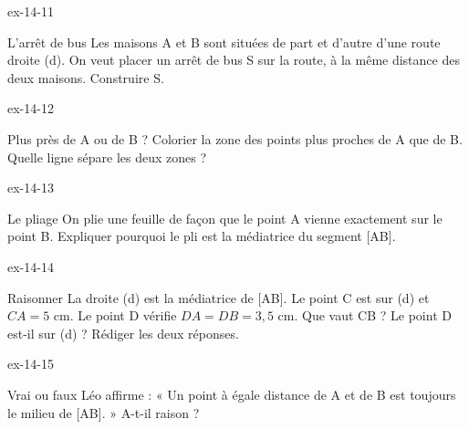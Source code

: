 \begin{blocLivre}{ex-14-11}\begin{exercice}[3]{L’arrêt de bus}
Les maisons A et B sont situées de part et d’autre d’une route droite (d). On veut placer un arrêt de bus S sur la route, à la même distance des deux maisons. Construire S.
\label{fig-ex-14-11}
\end{exercice}\end{blocLivre}
\begin{blocLivre}{ex-14-12}\begin{exercice}[3]{Plus près de A ou de B ?}
Colorier la zone des points plus proches de A que de B. Quelle ligne sépare les deux zones ?
\label{fig-ex-14-12}
\end{exercice}\end{blocLivre}
\begin{blocLivre}{ex-14-13}\begin{exercice}[3]{Le pliage}
On plie une feuille de façon que le point A vienne exactement sur le point B. Expliquer pourquoi le pli est la médiatrice du segment [AB].
\label{fig-ex-14-13}
\end{exercice}\end{blocLivre}
\begin{blocLivre}{ex-14-14}\begin{exercice}[3]{Raisonner}
La droite (d) est la médiatrice de [AB]. Le point C est sur (d) et $CA=5$ cm. Le point D vérifie $DA=DB=3{,}5$ cm. Que vaut CB ? Le point D est-il sur (d) ? Rédiger les deux réponses.
\label{fig-ex-14-14}
\end{exercice}\end{blocLivre}
\begin{blocLivre}{ex-14-15}\begin{exercice}[3]{Vrai ou faux}
Léo affirme : « Un point à égale distance de A et de B est toujours le milieu de [AB]. » A-t-il raison ?
\label{fig-ex-14-15}
\end{exercice}\end{blocLivre}

\clearpage
